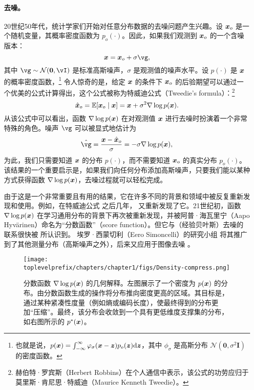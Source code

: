 \documentclass[../../book-main_zh.tex]{subfiles}
\begin{document}
\paragraph{去噪。}
20世纪50年代，统计学家们开始对任意分布数据的去噪问题产生兴趣。设 $\bm{x}_o$ 是一个随机变量，其概率密度函数为 $p_o(\cdot)$。因此，如果我们观测到 $\bm{x}_o$ 的一个含噪版本：
\begin{equation}
    \x = \x_o + \sigma \vg, 
\end{equation}
其中 $\vg \sim \dNorm(\vzero, \vI)$ 是标准高斯噪声，$\sigma$ 是观测值的噪声水平。设 $p(\cdot)$ 是 $\bm{x}$ 的概率密度函数，\footnote{也就是说，$p(\bm{x}) = \int_{-\infty}^{\infty} \varphi_{\sigma}(\bm{x} - \bm{z})p_o(\bm{z}) \mathrm{d}\bm{z}$，其中 $\phi_{\sigma}$ 是高斯分布 $\mathcal{N}(\boldsymbol{0}, \sigma^2 \boldsymbol{I})$ 的密度函数。} 令人惊奇的是，给定 $\bm{x}$ 的条件下 $\bm{x}_o$ 的后验期望可以通过一个优美的公式计算得出，这个公式被称为特威迪公式（Tweedie's formula）\cite{Robbins1956AnEB}：\footnote{赫伯特·罗宾斯（Herbert Robbins）在个人通信中表示，该公式的功劳应归于莫里斯·肯尼思·特威迪（Maurice Kenneth Tweedie）。}
\begin{equation}
    \hat {\bm{x}}_o = \mathbb{E}[\bm{x}_o\mid \bm{x}] = \bm{x} + \sigma^2 \nabla \log p(\bm{x}).
\end{equation}
从该公式中可以看出，函数 $\nabla \log p(\bm{x})$ 在对观测值 $\bm{x}$ 进行去噪时扮演着一个非常特殊的角色。噪声 $\vg$ 可以被显式地估计为
\begin{equation}
    \hat{\vg} = \frac{\x - \hat \x_o}{\sigma} = -\sigma \nabla \log p(\x),
\end{equation}
为此，我们只需要知道 $\bm{x}$ 的分布 $p(\cdot)$，而不需要知道 $\bm{x}_o$ 的真实分布 $p_o(\cdot)$。该结果的一个重要启示是，如果我们向任何分布添加高斯噪声，只要我们能以某种方式获得函数 $\nabla \log p(\bm{x})$，去噪过程就可以轻松完成。

由于这是一个非常重要且有用的结果，它在许多不同的背景和领域中被反复重新发现和使用。例如，在特威迪公式 \cite{Robbins1956AnEB} 之后几年，\cite{Miyasawa61} 又重新发现了它。21世纪初，函数 $\nabla \log p(\bm{x})$ 在学习通用分布的背景下再次被重新发现，并被阿普·海瓦里宁（Aapo Hyv\"{a}rinen）命名为“分数函数”（score function）\cite{hyvarinen05a}。但它与（经验贝叶斯）去噪的联系很快被 \cite{Vincent2011} 所认识到。
埃罗·西蒙切利（Eero Simoncelli）的研究小组 \cite{Raphan10} 将其推广到了其他测量分布（高斯噪声之外），后来又应用于图像去噪 \cite{Kadkhodaie21a,ho2020denoising}。

\begin{figure}
    \centering
    \texttt{[image: \\toplevelprefix/chapters/chapter1/figs/Density-compress.png]}
    \caption{分数函数 $\nabla \log p(\bm{x})$ 的几何解释。左图展示了一个密度为 $p(\bm{x})$ 的分布。由分数函数生成的操作将分布推向密度更高的区域。其目标是，通过某种紧凑性度量（例如熵或编码长度），使最终得到的分布更加“压缩”。最终，该分布会收敛到一个具有更低维度支撑集的分布，如右图所示的 $p^*(\bm{x})$。}
    \label{fig:score-function}
\end{figure}
\end{document}
